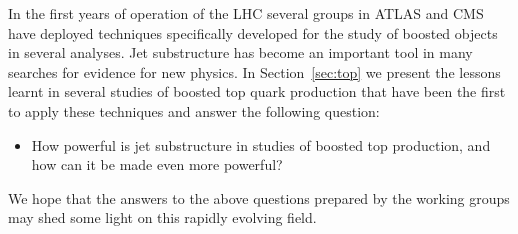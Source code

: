 In the first years of operation of the LHC several groups in ATLAS and CMS
have deployed techniques specifically developed for the study of 
boosted objects in several analyses. Jet substructure has become 
an important tool in many searches for evidence for new physics. 
In Section~\ref{sec:top} we present the lessons learnt in several
studies of boosted top quark production that have been the first
to apply these techniques and answer the following question: 
\begin{itemize}
\item How powerful is jet substructure in studies of boosted top production, and how can it be made even more powerful?
\end{itemize}

We hope that the answers to the above questions prepared by the working
groups may shed some light on this rapidly evolving field. 


